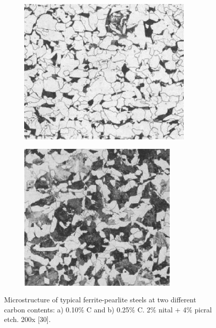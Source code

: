 \documentclass[12pt]{report}
\begin{document}
\begin{figure}[H]

\centering
\begin{subfigure}{.45\textwidth}
    \centering
    \includegraphics[height=.95\textwidth, width=\textwidth]{ferrite-pearlite_carbon_content_1.jpg}
    \caption{}
\end{subfigure}
\begin{subfigure}{.45\textwidth}
    \centering
    \includegraphics[height=.95\textwidth, width=\textwidth]{ferrite-pearlite_carbon_content_2.jpg}
    \caption{}
\end{subfigure}

\caption{Microstructure of typical ferrite-pearlite steels at two different carbon contents: a) 0.10\% C and b) 0.25\% C. 2\% nital + 4\% picral etch. 200x [30].}
\label{ch3:figure:contents}
\end{figure}
 
\end{document}
